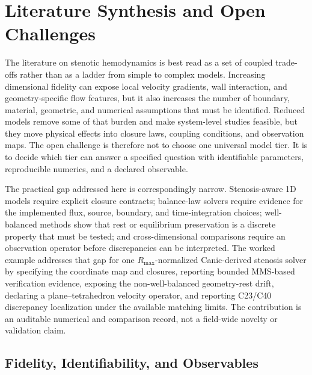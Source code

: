 \section{Literature Synthesis and Open Challenges}
\label{sec:literature-synthesis}
\label{sec:literature-synthesis-open-challenges}

The literature on stenotic hemodynamics is best read as a set of coupled
trade-offs rather than as a ladder from simple to complex models. Increasing
dimensional fidelity can expose local velocity gradients, wall interaction, and
geometry-specific flow features, but it also increases the number of boundary,
material, geometric, and numerical assumptions that must be identified. Reduced
models remove some of that burden and make system-level studies feasible, but
they move physical effects into closure laws, coupling conditions, and
observation maps. The open challenge is therefore not to choose one universal
model tier. It is to decide which tier can answer a specified question with
identifiable parameters, reproducible numerics, and a declared observable.

The practical gap addressed here is correspondingly narrow. Stenosis-aware 1D
models require explicit closure contracts; balance-law solvers require evidence
for the implemented flux, source, boundary, and time-integration choices;
well-balanced methods show that rest or equilibrium preservation is a discrete
property that must be tested; and cross-dimensional comparisons require an
observation operator before discrepancies can be interpreted. The worked
example addresses that gap for one $R_{\max}$-normalized Canic-derived stenosis
solver by specifying the coordinate map and closures, reporting bounded
MMS-based verification evidence, exposing the non-well-balanced geometry-rest
drift, declaring a plane--tetrahedron velocity operator, and reporting C23/C40
discrepancy localization under the available matching limits. The contribution
is an auditable numerical and comparison record, not a field-wide novelty or
validation claim.

\subsection{Fidelity, Identifiability, and Observables}
\label{subsec:synthesis-fidelity-identifiability-observables}

